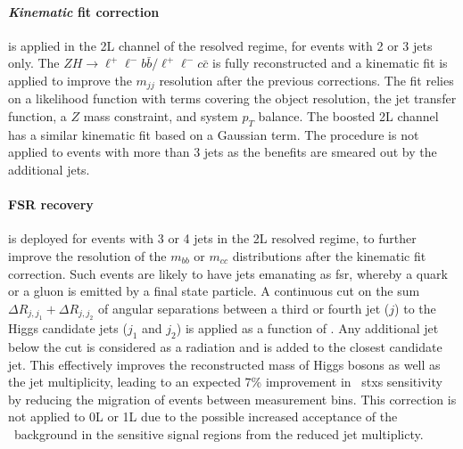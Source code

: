 \paragraph{\textit{Kinematic} fit correction} is applied in the 2L channel of the resolved regime, for events with 2 or 3 jets only. The $ZH \rightarrow \ell^+\ell^- b\bar{b} / \ell^+\ell^- c\bar{c}$ is fully reconstructed and a kinematic fit is applied to improve the $m_{jj}$ resolution after the previous corrections. The fit relies on a likelihood function with terms covering the object resolution, the jet transfer function, a $Z$ mass constraint, and system $p_T$ balance. The boosted 2L channel has a similar kinematic fit based on a Gaussian term. The procedure is not applied to events with more than 3 jets as the benefits are smeared out by the additional jets. %

\paragraph{FSR recovery} is deployed for events with 3 or 4 jets in the 2L resolved regime, to further improve the resolution of the $m_{bb}$ or $m_{cc}$ distributions after the kinematic fit correction. Such events are likely to have jets emanating as \gls{fsr}, whereby a quark or a gluon is emitted by a final state particle. A continuous cut on the sum $\Delta R_{j, j_1} + \Delta R_{j, j_2}$ of angular separations between a third or fourth jet ($j$) to the Higgs candidate jets ($j_1$ and $j_2$) is applied as a function of \ptv. Any additional jet below the cut is considered as a radiation and is added to the closest candidate jet. This effectively improves the reconstructed mass of Higgs bosons as well as the jet multiplicity, leading to an expected 7\% improvement in \vhb\ \gls{stxs} sensitivity by reducing the migration of events between measurement bins. This correction is not applied to 0L or 1L due to the possible increased acceptance of the \ttb\ background in the sensitive signal regions from the reduced jet multiplicty.